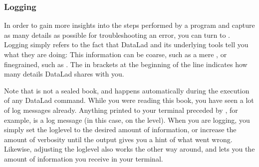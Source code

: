 \subsubsection{Logging}
\label{\detokenize{basics/101-135-help:logging}}\label{\detokenize{basics/101-135-help:id2}}
\sphinxAtStartPar
In order to gain more insights into the steps performed by a program and capture as many details as possible for troubleshooting an error, you can turn to {\hyperref[\detokenize{glossary:term-logging}]{}}.
Logging simply refers to the fact that DataLad and its underlying tools tell you what they are doing:
This information can be coarse, such as a mere , or fine\sphinxhyphen{}grained, such as .
The {\hyperref[\detokenize{glossary:term-log-level}]{}} in brackets at the beginning of the line indicates how many details DataLad shares with you.

\sphinxAtStartPar
Note that {\hyperref[\detokenize{glossary:term-logging}]{}} is not a sealed book, and happens automatically during the execution of any DataLad command.
While you were reading this book, you have seen a lot of log messages already.
Anything printed to your terminal preceded by \sphinxcode{\sphinxupquote{{[}INFO{]}}}, for example, is a log message (in this case, on the  level).
When you are  logging, you simply set the log\sphinxhyphen{}level to the desired amount of information, or increase the amount of verbosity until the output gives you a hint of what went wrong.
Likewise, adjusting the log\sphinxhyphen{}level also works the other way around, and lets you  the amount of information you receive in your terminal.

